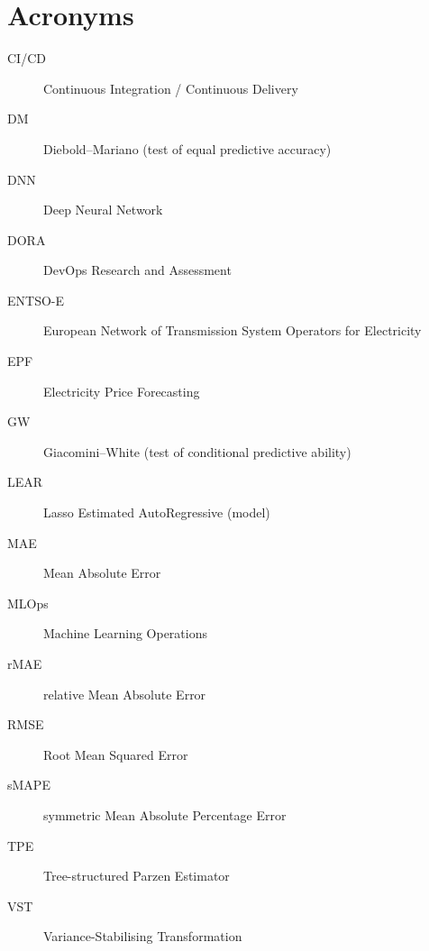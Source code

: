 \chapter*{Acronyms}
\begin{description}
  \item[CI/CD] Continuous Integration / Continuous Delivery
  \item[DM] Diebold--Mariano (test of equal predictive accuracy)
  \item[DNN] Deep Neural Network
  \item[DORA] DevOps Research and Assessment
  \item[ENTSO-E] European Network of Transmission System Operators for Electricity
  \item[EPF] Electricity Price Forecasting
  \item[GW] Giacomini--White (test of conditional predictive ability)
  \item[LEAR] Lasso Estimated AutoRegressive (model)
  \item[MAE] Mean Absolute Error
  \item[MLOps] Machine Learning Operations
  \item[rMAE] relative Mean Absolute Error
  \item[RMSE] Root Mean Squared Error
  \item[sMAPE] symmetric Mean Absolute Percentage Error
  \item[TPE] Tree-structured Parzen Estimator
  \item[VST] Variance-Stabilising Transformation
\end{description}
